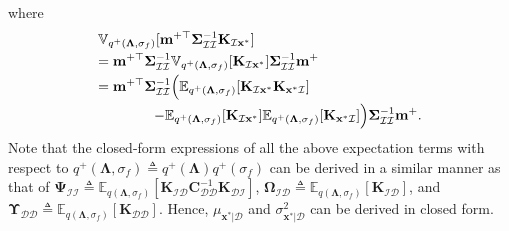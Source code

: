 \documentclass[conference]{IEEEtran}
\begin{document}
	where
	\begin{equation*}
		\begin{array}{l}
			\displaystyle\mathbb{V}_{q^+(\mathbf{\Lambda},\sigma_f)}[\mathbf{m}^{+\top} \mathbf{\Sigma}_\mathcal{II}^{-1}\mathbf{K}_{\mathcal{I}\mathbf{x}^*} ]\vspace{1mm}\\
			\displaystyle= \mathbf{m}^{+\top} \mathbf{\Sigma}_\mathcal{II}^{-1}\mathbb{V}_{q^+(\mathbf{\Lambda},\sigma_f)}[\mathbf{K}_{\mathcal{I}\mathbf{x}^*} ]\mathbf{\Sigma}_\mathcal{II}^{-1}\mathbf{m}^{+}\vspace{1mm}\\
			\displaystyle= \mathbf{m}^{+\top} \mathbf{\Sigma}_\mathcal{II}^{-1}\Big(\mathbb{E}_{q^+(\mathbf{\Lambda},\sigma_f)}[\mathbf{K}_{\mathcal{I}\mathbf{x}^*}\mathbf{K}_{\mathbf{x}^*\mathcal{I}} ]\vspace{1mm}\\
			\displaystyle\qquad\qquad -  \mathbb{E}_{q^+(\mathbf{\Lambda},\sigma_f)}[\mathbf{K}_{\mathcal{I}\mathbf{x}^*} ]\mathbb{E}_{q^+(\mathbf{\Lambda},\sigma_f)}[\mathbf{K}_{\mathbf{x}^*\mathcal{I}} ]\Big)\mathbf{\Sigma}_\mathcal{II}^{-1}\mathbf{m}^{+}.
		\end{array}
	\end{equation*}
	Note that the closed-form expressions of all the above expectation terms  with respect to 
$q^+(\mathbf{\Lambda},\sigma_f)\triangleq q^+(\mathbf{\Lambda})q^+(\sigma_f)$ can be derived in a similar manner as that of $\mathbf{\Psi}_\mathcal{II}\triangleq\mathbb{E}_{q(\mathbf{\Lambda},\sigma_f)}[\mathbf{K}_{\mathcal{ID}}\mathbf{C}^{-1}_\mathcal{DD}\mathbf{K}_{\mathcal{DI}}]$, $\mathbf{\Omega}_\mathcal{ID}\triangleq\mathbb{E}_{q(\mathbf{\Lambda},\sigma_f)}[\mathbf{K}_{\mathcal{ID}}]$, and $\mathbf{\Upsilon}_\mathcal{DD}\triangleq\mathbb{E}_{q(\mathbf{\Lambda},\sigma_f)}[\mathbf{K}_{\mathcal{DD}}]$. Hence, $\mu_{\mathbf{x}^*|\mathcal{D}}$ and $\sigma^2_{\mathbf{x}^*|\mathcal{D}}$ can be derived in closed form.
\end{document}
